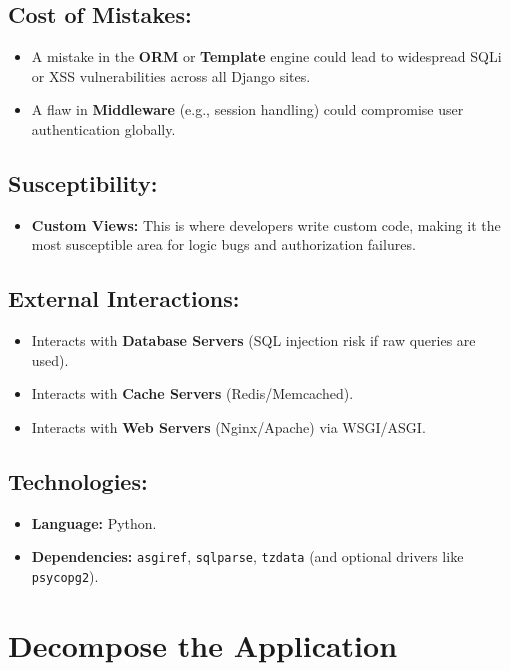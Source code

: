 \documentclass[10pt,a4paper]{article}
\begin{document}
\subsection*{Cost of Mistakes:}
\begin{itemize}
    \item A mistake in the \textbf{ORM} or \textbf{Template} engine could lead to widespread SQLi or XSS vulnerabilities across all Django sites.
    \item A flaw in \textbf{Middleware} (e.g., session handling) could compromise user authentication globally.
\end{itemize}

\subsection*{Susceptibility:}
\begin{itemize}
    \item \textbf{Custom Views:} This is where developers write custom code, making it the most susceptible area for logic bugs and authorization failures.
\end{itemize}

\subsection*{External Interactions:}
\begin{itemize}
    \item Interacts with \textbf{Database Servers} (SQL injection risk if raw queries are used).
    \item Interacts with \textbf{Cache Servers} (Redis/Memcached).
    \item Interacts with \textbf{Web Servers} (Nginx/Apache) via WSGI/ASGI.
\end{itemize}

\subsection*{Technologies:}
\begin{itemize}
    \item \textbf{Language:} Python.
    \item \textbf{Dependencies:} \texttt{asgiref}, \texttt{sqlparse}, \texttt{tzdata} (and optional drivers like \texttt{psycopg2}).
\end{itemize}

\section*{Decompose the Application}
\end{document}
